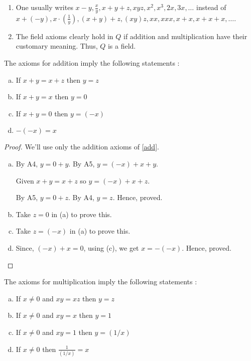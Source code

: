 \begin{rem}
    \begin{enumerate}
        \item One usually writes $ x - y, \frac{x}{y}, x + y + z, xyz, x^2, x^3, 2x, 3x, \dots $ instead of
        $ x + (-y), x \cdot \left( \frac{1}{y} \right), (x+y)+z, (xy)z, xx, xxx, x+x, x+x+x, \dots $.
        \item The field axioms clearly hold in $Q$ if addition and multiplication have their customary meaning.
        Thus, $Q$ is a field.

    \end{enumerate}
    
\end{rem}

\begin{prop}
    \label{addprop}
    The axioms for addition imply the following statements : 
    \begin{enumerate}[a)]
        \item If $x + y = x + z$ then $y = z$
        \item If $x + y = x$ then $y = 0$
        \item If $x + y = 0$ then $y = (-x)$
        \item $-(-x) = x$
    \end{enumerate}
\end{prop}

\begin{proof}
    We'll use only the addition axioms of \ref{add}.
    \begin{enumerate}[a)]
        \item 
            By A4, $y = 0 + y$.         
            By A5, $y = (-x) + x + y$. 

            Given $x + y = x + z$ so $y = (-x) + x + z$. 

            By A5, $y = 0 + z$. By A4, $y = z$. Hence, proved. 
        
        \item Take $z = 0$ in (a) to prove this.
        \item Take $z = (-x)$ in (a) to prove this.
        \item Since, $(-x) + x = 0$, using (c), we get $x = -(-x)$. Hence, proved.
    \end{enumerate}
\end{proof}


\begin{prop}
    \label{mulprop}
    The axioms for multiplication imply the following statements : 
    \begin{enumerate}[a)]
        \item If $x \neq 0$ and $xy = xz$  then $y = z$
        \item If $x \neq 0$ and $xy = x$ then $y = 1$
        \item If $x \neq 0$ and $xy = 1$ then $y = (1/x)$
        \item If $x \neq 0$ then $\frac{1}{(1/x)}= x$
    \end{enumerate}
\end{prop}


